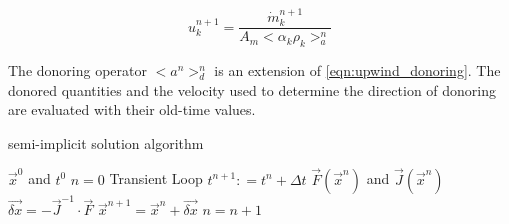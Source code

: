 \begin{equation}
\label{eqn:si_vel}
u^{n+1}_k = \frac{\dot{m}^{n+1}_k}{A_m <\alpha_k \rho_k>^{n}_{a}} 
\end{equation}

The donoring operator $<a^n>^{n}_{d}$ is an extension of \eqref{eqn:upwind_donoring}.
The donored quantities and the velocity used to determine the direction of donoring are evaluated with their old-time values.

\begin{algo}[H]
\caption{\cobra{} semi-implicit solution algorithm}
\label{alg:si_legacy}
\setlength{\baselineskip}{0.625\baselineskip}
\begin{algorithmic}[1]
\Require $\vec{x}^{0}$ and $t^{0}$
\Set $n = 0$
\Loop \; Transient Loop
    \State $t^{n+1} : = t^{n} + \Delta t$
	\Calculate $\vec{F}(\vec{x}^{n})$ and $\vec{J}(\vec{x}^{n})$
	\BlackBox $\vec{\delta x} = - \vec{J}^{-1}\cdot\vec{F}$
	\Calculate $\vec{x}^{n+1} = \vec{x}^{n} + \vec{\delta x}$
	\State $n = n + 1$
\EndLoop
\end{algorithmic}
\end{algo}

